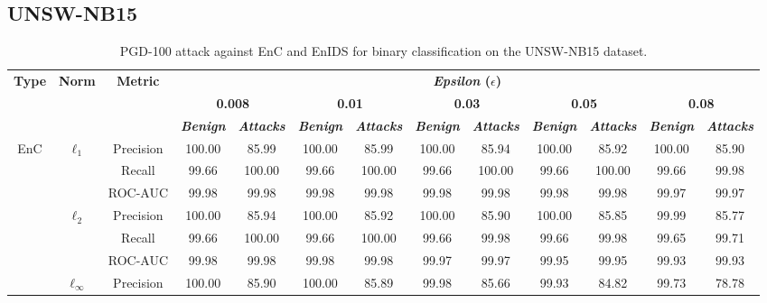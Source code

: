 \documentclass[conference]{IEEEtran}
\begin{document}
	
	\subsection{UNSW-NB15}
	\FloatBarrier
	
	
	\begin{table}
		\caption{PGD-100 attack against EnC and EnIDS for binary classification on the UNSW-NB15 dataset.}
		\small
		\setlength{\tabcolsep}{3pt}
		\centering
		\label{tab:unsw_bin_pgd}

		\begin{tabular}{|c|c|c|c|c|c|c|c|c|c|c|c|c|}
			\hline
			\multirow{3}{*}{\textbf{Type}} & \multirow{3}{*}{\textbf{Norm}} & \multirow{3}{*}{\textbf{Metric}} & \multicolumn{10}{c|}{\textbf{\textsl{Epsilon} ($\epsilon$)}} \\
			\cline{4-13}
			& & & \multicolumn{2}{c|}{\textbf{0.008}} & \multicolumn{2}{c|}{\textbf{0.01}} & \multicolumn{2}{c|}{\textbf{0.03}} & \multicolumn{2}{c|}{\textbf{0.05}} & \multicolumn{2}{c|}{\textbf{0.08}} \\
			\cline{4-13}
			& & & \textbf{\textsl{Benign}} & \textbf{\textsl{Attacks}} & \textbf{\textsl{Benign}} & \textbf{\textsl{Attacks}} & \textbf{\textsl{Benign}} & \textbf{\textsl{Attacks}} & \textbf{\textsl{Benign}} & \textbf{\textsl{Attacks}} & \textbf{\textsl{Benign}} & \textbf{\textsl{Attacks}} \\
			\hline
			\multirow{9}{*}{EnC} 
			& \multirow{3}{*}{\( \ell_1 \)} & Precision & 100.00 & 85.99 & 100.00 & 85.99 & 100.00 & 85.94 & 100.00 & 85.92 & 100.00 & 85.90
			\\
			
			&  & Recall & 99.66 & 100.00 & 99.66 & 100.00 & 99.66 & 100.00 & 99.66 & 100.00 & 99.66 & 99.98
			\\
			
			&  & ROC-AUC & 99.98 & 99.98 & 99.98 & 99.98 & 99.98 & 99.98 & 99.98 & 99.98 & 99.97 & 99.97
			\\
			\cline{2-13}
			& \multirow{3}{*}{\( \ell_2 \)} & Precision & 100.00 & 85.94 & 100.00 & 85.92 & 100.00 & 85.90 & 100.00 & 85.85 & 99.99 & 85.77
			\\
			
			&  & Recall & 99.66 & 100.00 & 99.66 & 100.00 & 99.66 & 99.98 & 99.66 & 99.98 & 99.65 & 99.71
			\\
			
			&  & ROC-AUC & 99.98 & 99.98 & 99.98 & 99.98 & 99.97 & 99.97 & 99.95 & 99.95 & 99.93 & 99.93
			\\
			\cline{2-13}
			& \multirow{3}{*}{\( \ell_\infty \)} & Precision & 100.00 & 85.90 & 100.00 & 85.89 & 99.98 & 85.66 & 99.93 & 84.82 & 99.73 & 78.78
			\\
			

\end{tabular}
\end{table}
\end{document}
